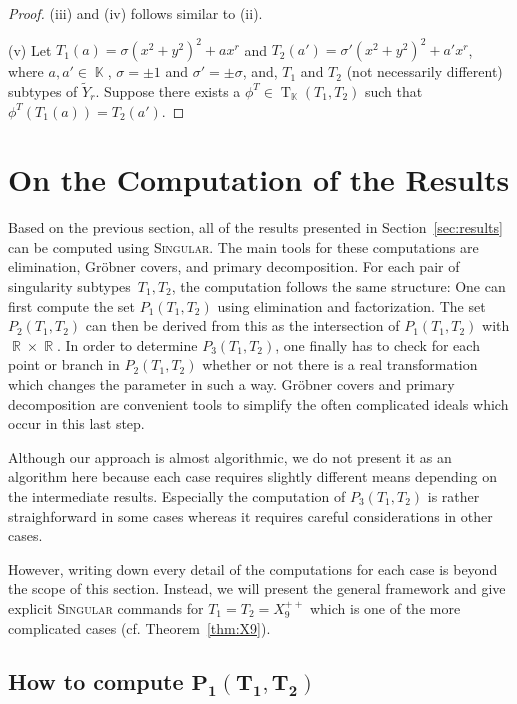 \documentclass[noend]{amsproc}
\theoremstyle{definition}
\newcommand{\Singular}{\textsc{Singular}}
\DeclareMathOperator{\R}{\mathbb{R}}
\DeclareMathOperator{\K}{\mathbb{K}}
\DeclareMathOperator{\T}{T}
\begin{document}
\begin{proof}
(iii) and (iv) follows similar to (ii).

(v) Let $T_1(a)=\sigma(x^2+y^2)^2+ax^r$ and $T_2(a')=\sigma'(x^2+y^2)^2+a'x^r$,
where $a,a'\in\K$, $\sigma=\pm 1$ and $\sigma'=\pm\sigma$, and, $T_1$ and $T_2$
(not necessarily different) subtypes of $\widetilde Y_{r}$. Suppose there
exists a $\phi^T\in\T_{\K}(T_1,T_2)$ such that $\phi^T(T_1(a))=T_2(a')$.
\end{proof}


\section{On the Computation of the Results}\label{OnTheComputationOfTheResults}

Based on the previous section, all of the results presented in
Section~\ref{sec:results} can be computed using \Singular{}. The main tools for
these computations are elimination, Gr\"obner covers, and primary
decomposition. For each pair of singularity subtypes~$T_1, T_2$, the
computation follows the same structure: One can first compute the set
$P_1(T_1, T_2)$ using elimination and factorization. The set $P_2(T_1, T_2)$
can then be derived from this as the intersection of $P_1(T_1, T_2)$ with
$\R \times \R$. In order to determine $P_3(T_1, T_2)$, one finally has to check
for each point or branch in $P_2(T_1, T_2)$ whether or not there is a real
transformation which changes the parameter in such a way. Gr\"obner covers and
primary decomposition are convenient tools to simplify the often complicated
ideals which occur in this last step.

Although our approach is almost algorithmic, we do not present it as an
algorithm here because each case requires slightly different means depending on
the intermediate results. Especially the computation of $P_3(T_1, T_2)$ is
rather straighforward in some cases whereas it requires careful considerations
in other cases.

However, writing down every detail of the computations for each case is beyond
the scope of this section. Instead, we will present the general framework and
give explicit \Singular{} commands for $T_1 = T_2 = X_9^{++}$ which is one of
the more complicated cases (cf. Theorem~\ref{thm:X9}).


\subsection{How to compute $\boldsymbol{P_1(T_1, T_2)}$}%
\label{sec:computing_P1}
\end{document}
